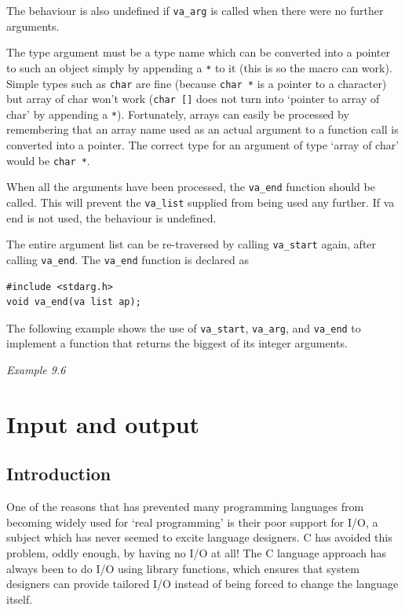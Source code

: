   The behaviour is also undefined if  \texttt{va\_arg}  is  called  when
   there were no further arguments.


  The type argument must be a type name which can be converted
   into  a pointer to such an object simply by appending a \texttt{*} to it
   (this is so the macro can work).  Simple  types  such  as \texttt{char}
   are  fine (because \texttt{char *} is a pointer to a character) but
   array of char won't work (\texttt{char []}  does  not  turn  into
   `pointer  to array of char' by appending a \texttt{*}).
   Fortunately, arrays can easily be processed by remembering that an  array
   name  used  as  an  actual  argument  to  a function call is converted into
   a pointer.  The correct type for an  argument of type `array
   of char' would be \texttt{char *}.


  When all the  arguments  have  been  processed,  the  \texttt{va\_end}
   function  should  be  called.  This will prevent the \texttt{va\_list}
   supplied from being used any  further.   If  va end  is  not used, the
   behaviour is undefined.


  The entire argument list  can  be  re-traversed  by  calling
   \texttt{va\_start}  again,  after calling \texttt{va\_end}.  The
   \texttt{va\_end} function is declared as


  \begin{Verbatim}
#include <stdarg.h>
void va_end(va list ap);
\end{Verbatim}

  The following example shows the use of \texttt{va\_start},
   \texttt{va\_arg}, and \texttt{va\_end}  to  implement a function that
   returns the biggest of its integer arguments.


  \begin{center}\textit{Example 9.6}\end{center}


 
        \section{Input and output}
        

  

  \subsection{Introduction}
   

   One of the reasons that has prevented many programming languages from
    becoming widely used for `real programming' is their poor support for
    I/O, a subject which has never seemed to excite language designers.
    C has avoided this problem, oddly enough, by having no I/O at all!
    The C language approach has always been to do I/O using library functions,
    which ensures that system designers can provide tailored I/O instead of
    being forced to change the language itself.


